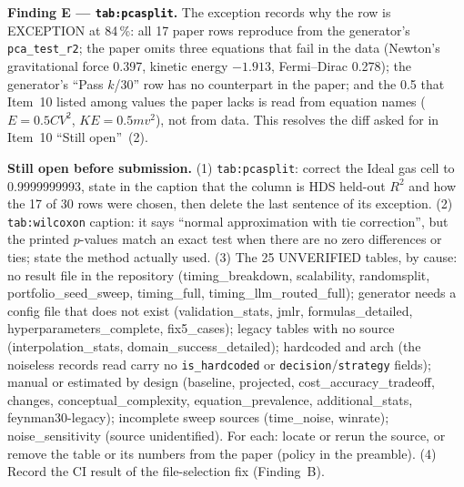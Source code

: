 \documentclass[11pt]{article}
\newcommand{\Rsq}{R^{2}}
\begin{document}
\textbf{Finding E --- \texttt{tab:pcasplit}.} The exception records why the row is EXCEPTION at 84\,\%: all 17 paper rows
reproduce from the generator's \texttt{pca\_test\_r2}; the paper omits three equations that fail in the data
(Newton's gravitational force 0.397, kinetic energy $-1.913$, Fermi--Dirac 0.278); the generator's ``Pass $k$/30'' row has no
counterpart in the paper; and the 0.5 that Item~10 listed among values the paper lacks is read from equation names
($E=0.5CV^2$, $KE=0.5mv^2$), not from data. This resolves the diff asked for in Item~10 ``Still open''~(2).

\textbf{Still open before submission.}
(1) \texttt{tab:pcasplit}: correct the Ideal gas cell to 0.9999999993, state in the caption that the column is HDS
held-out $\Rsq$ and how the 17 of 30 rows were chosen, then delete the last sentence of its exception.
(2) \texttt{tab:wilcoxon} caption: it says ``normal approximation with tie correction'', but the printed $p$-values match an
exact test when there are no zero differences or ties; state the method actually used.
(3) The 25 UNVERIFIED tables, by cause: no result file in the repository (timing\_breakdown, scalability, randomsplit,
portfolio\_seed\_sweep, timing\_full, timing\_llm\_routed\_full); generator needs a config file that does not exist
(validation\_stats, jmlr, formulas\_detailed, hyperparameters\_complete, fix5\_cases); legacy tables with no source
(interpolation\_stats, domain\_success\_detailed); hardcoded and arch (the noiseless records read carry no
\texttt{is\_hardcoded} or \texttt{decision}/\texttt{strategy} fields); manual or estimated by design (baseline, projected,
cost\_accuracy\_tradeoff, changes, conceptual\_complexity, equation\_prevalence, additional\_stats, feynman30-legacy);
incomplete sweep sources (time\_noise, winrate); noise\_sensitivity (source unidentified). For each: locate or rerun the source,
or remove the table or its numbers from the paper (policy in the preamble).
(4) Record the CI result of the file-selection fix (Finding~B).
\end{document}
